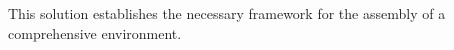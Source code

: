 This solution establishes the necessary framework for the assembly of a comprehensive  environment. 






